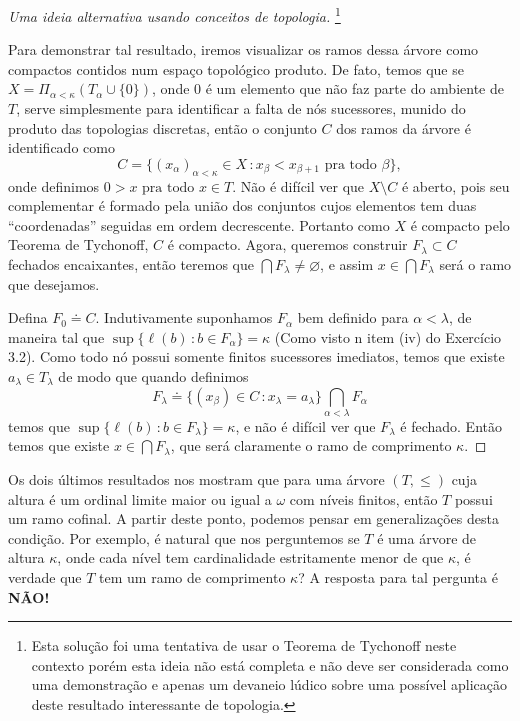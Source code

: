 \documentclass[a4paper]{article}
\begin{document}
    \begin{proof}[Uma ideia alternativa usando conceitos de topologia]
      \footnote{Esta solução foi uma tentativa
    de usar o Teorema de Tychonoff
    neste contexto porém esta ideia não está completa e
    não deve ser considerada como uma demonstração e
    apenas um devaneio lúdico sobre uma possível aplicação deste
    resultado interessante de topologia.}
  
   Para demonstrar tal resultado, iremos visualizar os ramos dessa árvore como
   compactos contidos num espaço topológico produto.
   De fato, temos que se \(X=\Pi_{\alpha<\kappa}(T_\alpha\cup\{0\})\),
   onde \(0\) é um elemento que não faz parte do ambiente de \(T\),
   serve simplesmente para identificar a falta de nós sucessores, munido do
   produto  das topologias discretas, então o conjunto \(C\) dos ramos da árvore
   é identificado como
   \[C=\{(x_\alpha)_{\alpha<\kappa}\in X \,\colon x_\beta<x_{\beta+1}\text{ pra
     todo }\beta\},\] onde definimos \(0>x\text{ pra todo }x\in T\). Não é
 difícil ver que \(X\setminus C\) é aberto, pois seu complementar é formado
 pela união dos conjuntos  cujos elementos tem duas ``coordenadas'' seguidas em
 ordem decrescente.
   Portanto como \(X\) é compacto pelo
   Teorema de Tychonoff, \(C\) é compacto. Agora, queremos construir
   \(F_\lambda\subset C\) fechados encaixantes, então teremos que
   \(\bigcap F_\lambda\neq\varnothing\), e assim \(x\in\bigcap F_\lambda\) será o
   ramo que desejamos.
  
   Defina \(F_0\doteq C\). Indutivamente suponhamos \(F_\alpha\) bem definido
   para \(\alpha<\lambda\), de maneira tal que \mbox{\(\sup\{\ell(b)\,\colon b\in
   F_\alpha\}=\kappa\)} (Como visto n item (iv) do  Exercício 3.2).
   Como todo nó possui somente finitos sucessores imediatos, temos que
    existe \(a_\lambda\in T_\lambda\) de modo que quando definimos
   \[F_\lambda\doteq\{(x_\beta)\in C\,\colon
     x_\lambda=a_\lambda\}\bigcap_{\alpha<\lambda} F_\alpha\] temos que
   \(\sup\{\ell(b)\,\colon b\in F_\lambda\}=\kappa\), e não é difícil ver que 
   \(F_\lambda\) é fechado. Então temos que existe \(x\in\bigcap F_\lambda\), que
   será claramente o ramo de comprimento \(\kappa\).
  \end{proof}

  Os dois últimos resultados nos mostram que para uma árvore \((T,\leq)\) cuja altura é um
  ordinal limite maior ou igual a \(\omega\) com níveis finitos, então \(T\)
  possui um ramo cofinal. A partir deste ponto, podemos pensar em generalizações
  desta condição. Por exemplo, é natural que nos perguntemos se $T$ é uma árvore
  de altura $\kappa$, onde cada nível tem cardinalidade estritamente menor de
  que \(\kappa\), é verdade que $T$ tem um
  ramo de comprimento $\kappa$?  A resposta para tal pergunta é \textbf{NÃO!}
\end{document}

